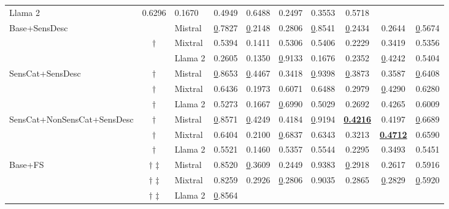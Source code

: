 \begin{table*}[!h]
\begin{tabular}{@{}lclccccccc@{}}
  Llama 2 &
  0.6296 &
  0.1670 &
  0.4949 &
  0.6488 &
  0.2497 &
  0.3553 &
  0.5718 \\ \cmidrule(l){3-10}
\multirow{3}{*}{Base+SensDesc} &
  &
  Mistral &
  {\ul 0.7827} &
  {\ul 0.2148} &
  0.2806 &
  {\ul 0.8541} &
  {\ul 0.2434} &
  0.2644 &
  {\ul 0.5674} \\
 &
  $\dagger$ \hspace{0.46em} &
  Mixtral &
  0.5394 &
  0.1411 &
  0.5306 &
  0.5406 &
  0.2229 &
  0.3419 &
  0.5356 \\
 &
  &
  Llama 2 &
  0.2605 &
  0.1350 &
  {\ul 0.9133} &
  0.1676 &
  0.2352 &
  {\ul 0.4242} &
  0.5404 \\ \cmidrule(l){3-10}
\multirow{3}{*}{SensCat+SensDesc} &
  $\dagger$ \hspace{0.46em} &
  Mistral &
  {\ul 0.8653} &
  {\ul 0.4467} &
  0.3418 &
  {\ul 0.9398} &
  {\ul 0.3873} &
  0.3587 &
  {\ul 0.6408} \\
 &
  $\dagger$ \hspace{0.46em} &
  Mixtral &
  0.6436 &
  0.1973 &
  0.6071 &
  0.6488 &
  0.2979 &
  {\ul 0.4290} &
  0.6280 \\
 &
  $\dagger$ \hspace{0.46em} &
  Llama 2 &
  0.5273 &
  0.1667 &
  {\ul 0.6990} &
  0.5029 &
  0.2692 &
  0.4265 &
  0.6009 \\ \cmidrule(l){3-10}
\multirow{3}{*}{SensCat+NonSensCat+SensDesc} &
  $\dagger$ \hspace{0.46em} &
  Mistral &
  {\ul 0.8571} &
  {\ul 0.4249} &
  0.4184 &
  {\ul 0.9194} &
  {\ul \textbf{0.4216}} &
  0.4197 &
  {\ul 0.6689} \\
 &
  $\dagger$ \hspace{0.46em} &
  Mixtral &
  0.6404 &
  0.2100 &
  {\ul 0.6837} &
  0.6343 &
  0.3213 &
  {\ul \textbf{0.4712}} &
  0.6590 \\
 &
  $\dagger$ \hspace{0.46em} &
  Llama 2 &
  0.5521 &
  0.1460 &
  0.5357 &
  0.5544 &
  0.2295 &
  0.3493 &
  0.5451 \\ \midrule %
  \midrule
\multirow{3}{*}{Base+FS} &
  $\dagger$ $\ddagger$ &
  Mistral &
  0.8520 &
  {\ul 0.3609} &
  0.2449 &
  0.9383 &
  {\ul 0.2918} &
  0.2617 &
  0.5916 \\
 &
  $\dagger$ $\ddagger$ &
  Mixtral &
  0.8259 &
  0.2926 &
  {\ul 0.2806} &
  0.9035 &
  0.2865 &
  {\ul 0.2829} &
  {\ul 0.5920} \\
 &
  $\dagger$ $\ddagger$ &
  Llama 2 &
  {\ul 0.8564} &

\end{tabular}
\end{table*}
